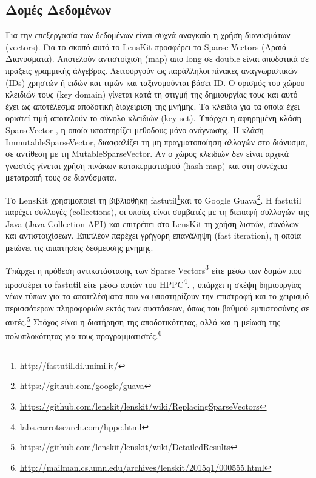 \subsection{Δομές Δεδομένων}
Για την επεξεργασία των δεδομένων είναι συχνά αναγκαία η χρήση διανυσμάτων ({\en vectors}). Για το σκοπό αυτό το {\en LensKit} προσφέρει τα \en Sparse Vectors \el(Αραιά Διανύσματα). Αποτελούν αντιστοίχιση ({\en map}) από {\en long} σε \en double  είναι αποδοτικά σε πράξεις γραμμικής άλγεβρας. Λειτουργούν ως παράλληλοι πίνακες αναγνωριστικών (\en IDs) \el χρηστών ή ειδών και τιμών και ταξινομούνται βάσει \en ID. \el Ο ορισμός του χώρου κλειδιών τους (\en key domain) \el γίνεται κατά τη στιγμή της δημιουργίας τους και αυτό έχει ως αποτέλεσμα αποδοτική διαχείριση της μνήμης. Τα κλειδιά για τα οποία έχει οριστεί τιμή αποτελούν το σύνολο κλειδιών \en(key set). \el Υπάρχει η αφηρημένη κλάση \en SparseVector \el, η οποία υποστηρίζει μεθοδους μόνο ανάγνωσης. Η κλάση \en ImmutableSparseVector, \el διασφαλίζει τη μη πραγματοποί\-ηση αλλαγών στο διάνυσμα, σε αντίθεση με τη \en MutableSparseVector. \el Αν ο χώρος κλειδιών δεν είναι αρχικά γνωστός γίνεται χρήση πινάκων κατακερματισμού \en (hash map) \el και στη συνέχεια μετατροπή τους σε διανύσματα. \par
Το \en LensKit \el χρησιμοποιεί τη βιβλιοθήκη \en fastutil\footnote{\url{http://fastutil.di.unimi.it/}}\el και το \en Google Guava\footnote{\url{https://github.com/google/guava}}. H fastutil \el παρέχει συλλογές \en (collections), \el οι οποίες είναι συμβατές με τη διεπαφή συλλογών της \en Java (Java Collection API) \el και επιτρέπει στο \en LensKit \el τη χρήση λιστών, συνόλων και αντιστοιχίσεων. Επιπλέον παρέχει γρήγορη επανάληψη (\en fast iteration), \el η οποία μειώνει τις απαιτήσεις δέσμευσης μνήμης. \par
Υπάρχει η πρόθεση αντικατάστασης των \en Sparse Vectors\footnote{\url{https://github.com/lenskit/lenskit/wiki/ReplacingSparseVectors}} \el είτε μέσω των δομών που προσφέρει το \en fastutil \el είτε μέσω αυτών του \en HPPC\footnote{\url{labs.carrotsearch.com/hppc.html}}. , υπάρχει η σκέψη δημιουργίας νέων τύπων για τα αποτελέσματα που να υποστηρίζουν την επιστροφή και το χειρισμό περισσότερων πληροφοριών εκτός των συστάσεων, όπως του βαθμού εμπιστοσύνης σε αυτές.\footnote{\en \url{https://github.com/lenskit/lenskit/wiki/DetailedResults}} Στόχος είναι η διατήρηση της αποδοτικότητας, αλλά και η μείωση της πολυπλοκότητας για τους προγραμματιστές.\footnote{\en \url{http://mailman.cs.umn.edu/archives/lenskit/2015q1/000555.html}}
